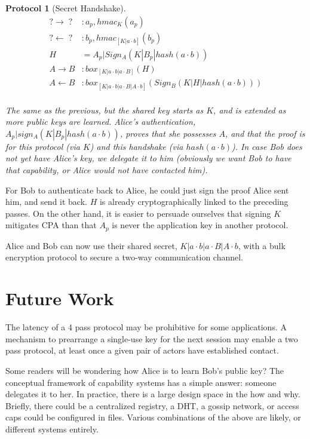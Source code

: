 \documentclass[12pt]{article}
\newtheorem{proto}{Protocol}
\begin{document}
\begin{samepage}
\begin{proto}[Secret Handshake]

  $$
  \begin{align*}
      ? \to \;?\;   &: a_{p}, hmac_{K}(a_{p})   \\
      ? \gets \;?\; &: b_{p}, hmac_{[K|a\cdot b]}(b_{p}) \\
      H&=A_{p}|Sign_A(K|B_{p}|hash(a\cdot b)) \\
      A \to B       &: box_{[K|a \cdot b | a \cdot B]}(H)\\
      A \gets B     &:
        box_{[K|a \cdot b | a \cdot B | A \cdot b]}(Sign_B(K|H|hash(a\cdot b)) )\\
  \end{align*}
  $$

  The same as the previous, but the shared key starts
  as $K$, and is extended as more public keys are learned.
  Alice's authentication, $A_{p}|sign_A(K|B_p|hash(a\cdot b))$,
  proves that she possesses $A$, and that the proof is for this protocol
  (via $K$) and this handshake (via $hash(a\cdot b)$).
  In case Bob does not yet have Alice's key, we delegate it to him
  (obviously we want Bob to have that capability, or Alice would not have
  contacted him).
\end{proto}
\end{samepage}

For Bob to authenticate back to Alice, he could just sign the proof
Alice sent him, and send it back. $H$ is already cryptographically
linked to the preceding passes. On the other hand, it is easier to
persuade ourselves that signing $K$ mitigates CPA\cite{cpa} than that
$A_p$ is never the application key in another protocol.

Alice and Bob can now use their shared secret,
$K|a \cdot b|a \cdot B|A \cdot b$, with a bulk encryption protocol
to secure a two-way communication channel.

\section{Future Work}

The latency of a 4 pass protocol may be prohibitive for some
applications. A mechanism to prearrange a single-use
key for the next session may enable a two pass protocol, at least
once a given pair of actors have established contact.

Some readers will be wondering how Alice is to learn Bob's public key?
The conceptual framework of capability systems has a simple answer:
someone delegates it to her. In practice, there is a large design space
in the how and why.
Briefly, there could be a centralized registry, a DHT, a gossip network,
or access caps could be configured in files. Various combinations of
the above are likely, or different systems entirely.
\end{document}
